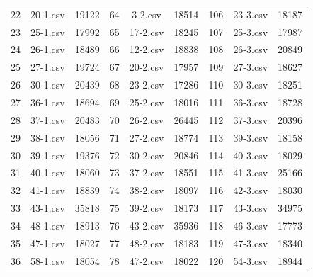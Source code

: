 \begin{longtable}{|c|c|c|c|c|c|c|c|c|}
  22          & 20-1.csv       & 19122         & 64          & 3-2.csv        & 18514         & 106         & 23-3.csv       & 18187         \\
  23          & 25-1.csv       & 17992         & 65          & 17-2.csv       & 18245         & 107         & 25-3.csv       & 17987         \\
  24          & 26-1.csv       & 18489         & 66          & 12-2.csv       & 18838         & 108         & 26-3.csv       & 20849         \\
  25          & 27-1.csv       & 19724         & 67          & 20-2.csv       & 17957         & 109         & 27-3.csv       & 18627         \\
  26          & 30-1.csv       & 20439         & 68          & 23-2.csv       & 17286         & 110         & 30-3.csv       & 18251         \\
  27          & 36-1.csv       & 18694         & 69          & 25-2.csv       & 18016         & 111         & 36-3.csv       & 18728         \\
  28          & 37-1.csv       & 20483         & 70          & 26-2.csv       & 26445         & 112         & 37-3.csv       & 20396         \\
  29          & 38-1.csv       & 18056         & 71          & 27-2.csv       & 18774         & 113         & 39-3.csv       & 18158         \\
  30          & 39-1.csv       & 19376         & 72          & 30-2.csv       & 20846         & 114         & 40-3.csv       & 18029         \\
  31          & 40-1.csv       & 18060         & 73          & 37-2.csv       & 18551         & 115         & 41-3.csv       & 25166         \\
  32          & 41-1.csv       & 18839         & 74          & 38-2.csv       & 18097         & 116         & 42-3.csv       & 18030         \\
  33          & 43-1.csv       & 35818         & 75          & 39-2.csv       & 18173         & 117         & 43-3.csv       & 34975         \\
  34          & 48-1.csv       & 18913         & 76          & 43-2.csv       & 35936         & 118         & 46-3.csv       & 17773         \\
  35          & 47-1.csv       & 18027         & 77          & 48-2.csv       & 18183         & 119         & 47-3.csv       & 18340         \\
  36          & 58-1.csv       & 18054         & 78          & 47-2.csv       & 18022         & 120         & 54-3.csv       & 18944         \\

\end{longtable}
